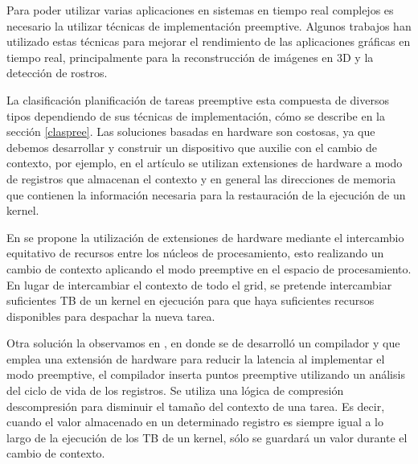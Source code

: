 Para poder utilizar varias aplicaciones en sistemas en tiempo real complejos es necesario la utilizar técnicas de implementación preemptive. Algunos trabajos han utilizado estas técnicas para mejorar el rendimiento de las aplicaciones gráficas en tiempo real, principalmente para la reconstrucción de imágenes en 3D y la detección de rostros.
\newline

La clasificación planificación de tareas preemptive esta compuesta de diversos tipos dependiendo de sus técnicas de implementación, cómo se describe en la sección \ref{claspree}. 
Las soluciones basadas en hardware son costosas, ya que debemos desarrollar y construir un dispositivo que auxilie con el cambio de contexto, por ejemplo, en el artículo \cite{18} se utilizan extensiones de hardware a modo de registros que almacenan el contexto y en general las direcciones de memoria que contienen la información necesaria para la restauración de la ejecución de un kernel. 

\vspace{0.3cm}

En \cite{20} se propone la utilización de extensiones de hardware mediante el intercambio equitativo de recursos entre los núcleos de procesamiento, esto realizando un cambio de contexto aplicando el modo preemptive en el espacio de procesamiento. En lugar de intercambiar el contexto de todo el grid, se pretende intercambiar suficientes TB de un kernel en ejecución para que haya suficientes recursos disponibles para despachar la nueva tarea. 

\vspace{0.3cm}

Otra solución la observamos en \cite{8}, en donde se de desarrolló un compilador y que emplea una extensión de hardware para reducir la latencia al implementar el modo preemptive, el compilador inserta puntos preemptive utilizando un análisis del ciclo de vida de los registros. Se utiliza una lógica de compresión descompresión para disminuir el tamaño del contexto de una tarea. Es decir, cuando el valor almacenado en un determinado registro es siempre igual a lo largo de la ejecución de los TB de un kernel, sólo se guardará un valor durante el cambio de contexto.



